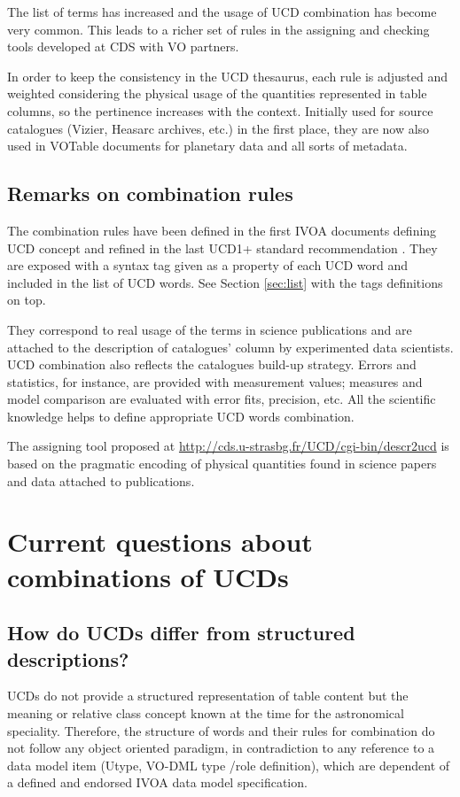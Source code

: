\documentclass[11pt,a4paper]{ivoa}
\begin{document}
The list of terms has increased and the usage of UCD combination has become very common. This leads
to a richer set of rules in the assigning and checking tools developed at CDS with VO partners.

In order to keep the consistency in the UCD thesaurus, each rule is adjusted and weighted considering 
the physical usage of the quantities represented in table columns, so the pertinence increases with 
the context. Initially used for source catalogues (Vizier, Heasarc archives, etc.) in the first place, 
they are now also used in VOTable documents for planetary data \citep{wd:epntap,erard-vespa} and all sorts of metadata.

\subsection{Remarks on combination rules}
The combination rules have been defined in the first IVOA documents defining UCD concept
\citep{2005ivoa.spec.0819D} and refined in the last UCD1+ standard recommendation \citep{2018ivoa.spec.0527PM}. 
They are exposed with a syntax tag given as a property of each UCD word 
and included in the list of UCD words. See Section \ref{sec:list} with the tags definitions on top.

They correspond to real usage of the terms in science publications and are attached to the description 
of catalogues’ column by experimented data scientists. UCD combination also reflects the catalogues 
build-up strategy. Errors and statistics, for instance, are provided with measurement values; measures 
and model comparison are evaluated with error fits, precision, etc. All the scientific knowledge helps 
to define appropriate UCD words combination.

The assigning tool proposed at \url{http://cds.u-strasbg.fr/UCD/cgi-bin/descr2ucd} is based on the
pragmatic encoding of physical quantities found in science papers and data attached to publications.

\section{Current questions about combinations of UCDs}
\subsection{How do UCDs differ from structured descriptions?}

UCDs do not provide a structured representation of table content but the meaning or relative class 
concept known at the time for the astronomical speciality. Therefore, the structure of words and 
their rules for combination do not follow any object oriented paradigm, in contradiction to any 
reference to a data model item (Utype, VO-DML type /role definition), which are dependent of a 
defined and endorsed IVOA data model specification.
\end{document}
